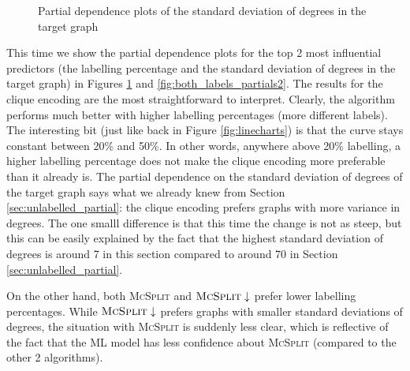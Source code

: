 \documentclass{l4proj}
\theoremstyle{definition}
\theoremstyle{remark}
\begin{document}
\begin{figure}
\begin{subfigure}[t]{0.49\textwidth}
  \end{subfigure}
  \caption{Partial dependence plots of the standard deviation of degrees in the
    target graph}
  \label{fig:both_labels_partials1}
\end{figure}

This time we show the partial dependence plots for the top 2 most influential
predictors (the labelling percentage and the standard deviation of degrees in
the target graph) in Figures \ref{fig:both_labels_partials1} and
\ref{fig:both_labels_partials2}. The results for the clique encoding are the
most straightforward to interpret. Clearly, the algorithm performs much better
with higher labelling percentages (more different labels). The interesting bit
(just like back in Figure \ref{fig:linecharts}) is that the curve
stays constant between 20\% and 50\%. In other words, anywhere above 20\%
labelling, a higher labelling percentage does not make the clique encoding more
preferable than it already is. The partial dependence on the standard deviation
of degrees of the target graph says what we already knew from Section
\ref{sec:unlabelled_partial}: the clique encoding prefers graphs with more
variance in degrees. The one smalll difference is that this time the change is
not as steep, but this can be easily explained by the fact that the highest
standard deviation of degrees is around 7 in this section compared to around 70
in Section \ref{sec:unlabelled_partial}.

On the other hand, both \textsc{McSplit} and $\textsc{McSplit}\downarrow$ prefer
lower labelling percentages. While $\textsc{McSplit}\downarrow$ prefers graphs
with smaller standard deviations of degrees, the situation with \textsc{McSplit}
is suddenly less clear, which is reflective of the fact that the ML model has less
confidence about \textsc{McSplit} (compared to the other 2 algorithms).
\end{document}
